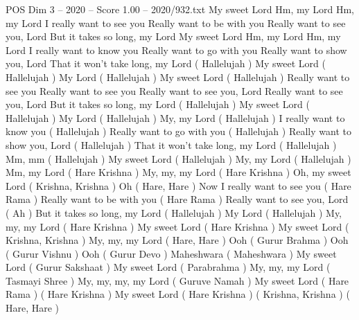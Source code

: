 \begin{textsample}{POS Dim 3 – 2020 – Score 1.00 – 2020/932.txt}  \label{ex:f3_pos_007}
My sweet Lord Hm, my Lord Hm, my Lord I really want to see you Really want to be with you Really want to see you, Lord But it takes so long, my Lord My sweet Lord Hm, my Lord Hm, my Lord I really want to know you Really want to go with you Really want to show you, Lord That it won't take long, my Lord ( Hallelujah ) My sweet Lord ( Hallelujah ) My Lord ( Hallelujah ) My sweet Lord ( Hallelujah ) Really want to see you Really want to see you Really want to see you, Lord Really want to see you, Lord But it takes so long, my Lord ( Hallelujah ) My sweet Lord ( Hallelujah ) My Lord ( Hallelujah ) My, my Lord ( Hallelujah ) I really want to know you ( Hallelujah ) Really want to go with you ( Hallelujah ) Really want to show you, Lord ( Hallelujah ) That it won't take long, my Lord ( Hallelujah ) Mm, mm ( Hallelujah ) My sweet Lord ( Hallelujah ) My, my Lord ( Hallelujah ) Mm, my Lord ( Hare Krishna ) My, my, my Lord ( Hare Krishna ) Oh, my sweet Lord ( Krishna, Krishna ) Oh ( Hare, Hare ) Now I really want to see you ( Hare Rama ) Really want to be with you ( Hare Rama ) Really want to see you, Lord ( Ah ) But it takes so long, my Lord ( Hallelujah ) My Lord ( Hallelujah ) My, my, my Lord ( Hare Krishna ) My sweet Lord ( Hare Krishna ) My sweet Lord ( Krishna, Krishna ) My, my, my Lord ( Hare, Hare ) Ooh ( Gurur Brahma ) Ooh ( Gurur Vishnu ) Ooh ( Gurur Devo ) Maheshwara ( Maheshwara ) My sweet Lord ( Gurur Sakshaat ) My sweet Lord ( Parabrahma ) My, my, my Lord ( Tasmayi Shree ) My, my, my, my Lord ( Guruve Namah ) My sweet Lord ( Hare Rama ) ( Hare Krishna ) My sweet Lord ( Hare Krishna ) ( Krishna, Krishna ) ( Hare, Hare )

\end{textsample}
